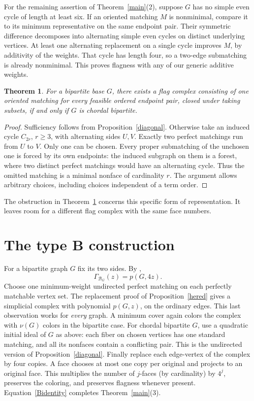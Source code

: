 \documentclass[11pt]{article}
\newtheorem{theorem}{Theorem}[section]
\newcommand{\G}{\Gamma}
\newcommand{\B}{\mathcal B}
\begin{document}
For the remaining assertion of Theorem~\ref{main}(2), suppose $G$ has no simple even cycle of length at least six. If an oriented matching $M$ is nonminimal, compare it to its minimum representative on the same endpoint pair. Their symmetric difference decomposes into alternating simple even cycles on distinct underlying vertices. At least one alternating replacement on a single cycle improves $M$, by additivity of the weights. That cycle has length four, so a two-edge submatching is already nonminimal. This proves flagness with any of our generic additive weights.

\begin{theorem}\label{iff}
For a bipartite base $G$, there exists a flag complex consisting of one oriented matching for every feasible ordered endpoint pair, closed under taking subsets, if and only if $G$ is chordal bipartite.
\end{theorem}
\begin{proof}
Sufficiency follows from Proposition~\ref{diagonal}. Otherwise take an induced cycle $C_{2r}$, $r\ge3$, with alternating sides $U,V$. Exactly two perfect matchings run from $U$ to $V$. Only one can be chosen. Every proper submatching of the unchosen one is forced by its own endpoints: the induced subgraph on them is a forest, where two distinct perfect matchings would have an alternating cycle. Thus the omitted matching is a minimal nonface of cardinality $r$. The argument allows arbitrary choices, including choices independent of a term order.
\end{proof}
The obstruction in Theorem~\ref{iff} concerns this specific form of representation. It leaves room for a different flag complex with the same face numbers.

\section{The type B construction}
For a bipartite graph $G$ fix its two sides. By \cite[Prop.~4.1 and Thm.~7.1]{OT},
\begin{equation}\label{Bidentity}
 \G_{\B_G}(z)=p(G,4z).
\end{equation}
Choose one minimum-weight undirected perfect matching on each perfectly matchable vertex set. The replacement proof of Proposition~\ref{hered} gives a simplicial complex with polynomial $p(G,z)$, on the ordinary edges. This last observation works for \emph{every} graph. A minimum cover again colors the complex with $\nu(G)$ colors in the bipartite case. For chordal bipartite $G$, use a quadratic initial ideal of $G$ as above: each fiber on chosen vertices has one standard matching, and all its nonfaces contain a conflicting pair. This is the undirected version of Proposition~\ref{diagonal}. Finally replace each edge-vertex of the complex by four copies. A face chooses at most one copy per original and projects to an original face. This multiplies the number of $j$-faces (by cardinality) by $4^j$, preserves the coloring, and preserves flagness whenever present. Equation~\eqref{Bidentity} completes Theorem~\ref{main}(3).
\end{document}
